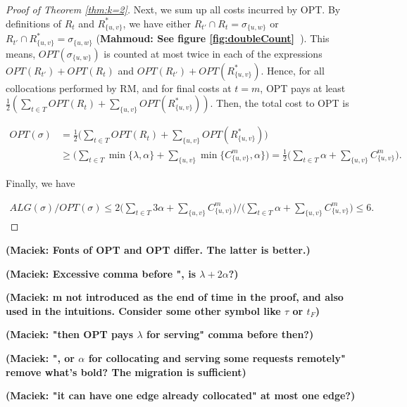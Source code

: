 \documentclass[a4paper,anonymous,USenglish]{lipics-v2019}
\newcommand{\OPT}{\textsf{OPT}\xspace}
\newcommand{\OPTM}{\mathit{OPT}}
\newcommand{\RM}{\textsf{RM}\xspace} %
\newcommand\mahmoud[1]{\color{orange}\textbf{Mahmoud: #1~}\color{black}}
\newcommand\maciek[1]{\color{brown}\textbf{(Maciek: #1)}\color{black}}
\begin{document}
\begin{proof}[Proof of Theorem \ref{thm:k=2}]
	Next, we sum up all costs incurred by \OPT.
	By definitions of $R_t$ and $R^*_{\{u,v\}}$, we have either
	$R_{t'} \cap R_t = \sigma_{\{u,w\}}$ or
	$R_{t'} \cap R^*_{\{u,v\}} = \sigma_{\{u,w\}}$
	(\mahmoud{See figure \ref{fig:doubleCount}}). 
	This means,
	$\OPTM ( \sigma_{\{u,w\}})$
	is counted at most twice in each of  the expressions
	$\mathit{OPT} (R_{t'}) + \mathit{OPT} (R_t)$
	and  
	$\mathit{OPT} (R_{t'}) + \mathit{OPT} (R^*_{\{u,v\}})$.
	Hence,
	for all collocations performed by \RM,
	and for final costs at $t=m$,
	\OPT pays at least 
	$\frac{1}{2}(
	\sum_{ t \in T } \mathit{OPT} (R_t) +
	\sum_{\{u,v\}} \mathit{OPT} (R^*_{\{u,v\}})
	) $.
	Then,
	the total cost to \OPT is
	
	\begin{align*} 	%
		\mathit{OPT} (\sigma)
		&=
		\frac{1}{2}
		\Big(
		\sum_{ t \in T} \mathit{OPT} (R_t) 
		+ \sum_{\{u,v\}}\mathit{OPT} (R^*_{\{u,v\}})
		\Big)	\\
		&\geq
		\Big(
		\sum_{ t \in T} \min{ \{ \lambda, \alpha \}}  +
		\sum_{\{u,v\}} \min{ \{C^{m}_{\{u,v\}} , \alpha \} } 
		\Big)		
		=
		\frac{1}{2}		
		\Big(
		\sum_{ t \in T} \alpha  
		+ \sum_{\{u,v\}} C^{m}_{\{u,v\}}
		\Big).
	\end{align*}

Finally, we have

\begin{align*}
	\mathit{ALG} (\sigma)	/
	\mathit{OPT} (\sigma)
	\leq
	2\Big(
	\sum_{ t \in T} 3\alpha +
	\sum_{\{u,v\}} C^{m}_{\{u,v\}}
	\Big)	 \big /
	\Big(
	\sum_{ t \in T} \alpha  
	+ \sum_{\{u,v\}} C^{m}_{\{u,v\}}  
	\Big)	\leq 6.
\end{align*}

\end{proof}
\maciek{Fonts of OPT and \OPT differ. The latter is better.}

\maciek{Excessive comma before ", is $\lambda +2\alpha$?}

\maciek{m not introduced as the end of time in the proof, and also used in the intuitions. Consider some other symbol like $\tau$ or $t_F$}

\maciek{"then \OPT pays $\lambda$ for serving" comma before then?}

\maciek{", or $\alpha$ for collocating \textbf{and serving some requests remotely}" remove what's bold? The migration is sufficient}

\maciek{"it can have one edge already collocated" at most one edge?}
\end{document}
